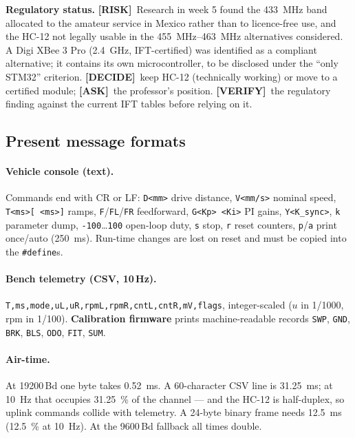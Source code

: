 \documentclass[11pt,a4paper]{article}
\newcommand{\mk}[2]{\textsf{\scriptsize\bfseries\colorbox{#1bg}{\color{#1}[#2]}}}
\newcommand{\VERIFY}{\mk{cold}{VERIFY}}
\newcommand{\DECIDE}{\mk{accent}{DECIDE}}
\newcommand{\ASK}{\mk{good}{ASK}}
\newcommand{\RISK}{\mk{bad}{RISK}}
\newcommand{\code}[1]{\texttt{\small #1}}
\begin{document}
\begin{warnbox}
\textbf{Regulatory status.} \RISK\ Research in week 5 found the \qty{433}{MHz}
band allocated to the amateur service in Mexico rather than to licence-free use,
and the HC-12 not legally usable in the \qtyrange{455}{463}{MHz} alternatives
considered. A Digi XBee 3 Pro (\qty{2.4}{GHz}, IFT-certified) was identified as a
compliant alternative; it contains its own microcontroller, to be disclosed under
the ``only STM32'' criterion. \DECIDE\ keep HC-12 (technically working) or move to
a certified module; \ASK\ the professor's position. \VERIFY\ the regulatory
finding against the current IFT tables before relying on it.
\end{warnbox}

\subsection{Present message formats}

\paragraph{Vehicle console (text).} Commands end with CR or LF:
\code{D<mm>} drive distance, \code{V<mm/s>} nominal speed, \code{T<ms>[ <ms>]}
ramps, \code{F}/\code{FL}/\code{FR} feedforward, \code{G<Kp> <Ki>} PI gains,
\code{Y<K\_sync>}, \code{k} parameter dump, \code{-100}\ldots\code{100} open-loop
duty, \code{s} stop, \code{r} reset counters, \code{p}/\code{a} print once/auto
(\qty{250}{ms}). Run-time changes are lost on reset and must be copied into the
\code{\#define}s.

\paragraph{Bench telemetry (CSV, 10\,Hz).}
\code{T,ms,mode,uL,uR,rpmL,rpmR,cntL,cntR,mV,flags}, integer-scaled ($u$ in
1/1000, rpm in 1/100). \textbf{Calibration firmware} prints machine-readable
records \code{SWP}, \code{GND}, \code{BRK}, \code{BLS}, \code{ODO}, \code{FIT},
\code{SUM}.

\paragraph{Air-time.} At 19200\,Bd one byte takes \qty{0.52}{ms}. A 60-character
CSV line is \qty{31.25}{ms}; at \qty{10}{Hz} that occupies \qty{31.25}{\percent} of the
channel --- and the HC-12 is half-duplex, so uplink commands collide with
telemetry. A 24-byte binary frame needs \qty{12.5}{ms} (\qty{12.5}{\percent} at
\qty{10}{Hz}). At the 9600\,Bd fallback all times double.
\end{document}
